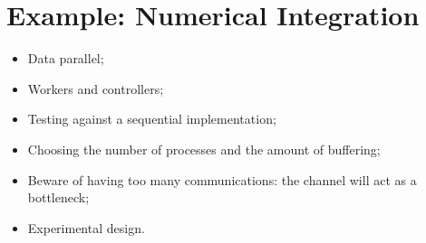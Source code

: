 \chapter{Example: Numerical Integration}






\begin{slide}

\begin{itemize}
\item
Data parallel;

\item
Workers and controllers;


\item
Testing against a sequential implementation;

\item
Choosing the number of processes and the amount of buffering;

\item
Beware of having too many communications: the channel will act as a bottleneck;

\item
Experimental design.
\end{itemize}
\end{slide}

